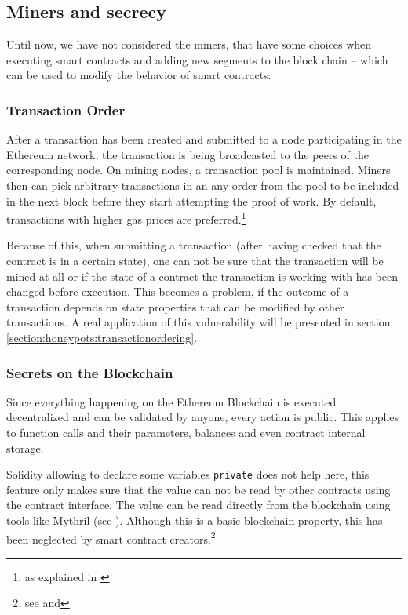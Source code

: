 \subsection{Miners and secrecy}
Until now, we have not considered the miners, that have some choices when executing smart contracts and adding new segments to the block chain -- which can be used to modify the behavior of smart contracts:

\subsubsection{Transaction Order}
\label{section:vulnerability:transactionorder}
After a transaction has been created and submitted to a node participating in the Ethereum network, the transaction is being broadcasted to the peers of the corresponding node. On mining nodes, a transaction pool is maintained. Miners then can pick arbitrary transactions in an any order from the pool to be included in the next block before they start attempting the proof of work. By default, transactions with higher gas prices are preferred.\footnote{as explained in \cite{blockchannel:lifecycletransaction}}

Because of this, when submitting a transaction (after having checked that the contract is in a certain state), one can not be sure that the transaction will be mined at all or if the state of a contract the transaction is working with has been changed before execution. This becomes a problem, if the outcome of a transaction depends on state properties that can be modified by other transactions. A real application of this vulnerability will be presented in section \ref{section:honeypots:transactionordering}.

\subsubsection{Secrets on the Blockchain}
\label{sec:miners:secretsontheblockchain}
Since everything happening on the Ethereum Blockchain is executed decentralized and can be validated by anyone, every action is public. This applies to function calls and their parameters, balances and even contract internal storage.

Solidity allowing to declare some variables \texttt{private} does not help here, this feature only makes sure that the value can not be read by other contracts using the contract interface. The value can be read directly from the blockchain using tools like Mythril (see \cite{consensys:mythril}). Although this is a basic blockchain property, this has been neglected by smart contract creators.\footnote{see \cite{delmolino:rps} and\cite[Page 10 (Keeping secrets)]{atzei:attacksurvey}}

